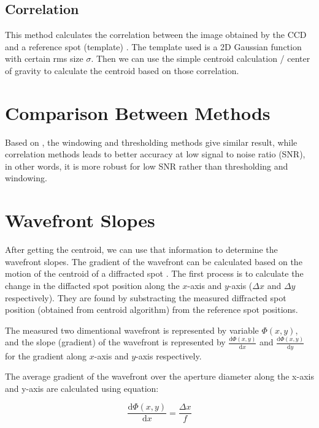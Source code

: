 \documentclass{article}
\begin{document}
\subsection{Correlation}

This method calculates the correlation between the image obtained by the CCD and a reference spot (template) \cite{poyneer03}. The template used is a 2D Gaussian function with certain rms size $\sigma$. Then we can use the simple centroid calculation / center of gravity to calculate the centroid based on those correlation.


\section{Comparison Between Methods}

Based on \cite{thomas04}, the windowing and thresholding methods give similar result, while correlation methods leads to better accuracy at low signal to noise ratio (SNR), in other words, it is more robust for low SNR rather than thresholding and windowing.

\section{Wavefront Slopes}

After getting the centroid, we can use that information to determine the wavefront slopes. The gradient of the wavefront can be calculated based on the motion of the centroid of a diffracted spot \cite{spiricon04}. The first process is to calculate the change in the diffacted spot position along the $x$-axis and $y$-axis ($\Delta x$ and $\Delta y$ respectively). They are found by substracting the measured diffracted spot position (obtained from centroid algorithm) from the reference spot positions.

The measured two dimentional wavefront is represented by variable $\Phi(x,y)$, and the slope (gradient) of the wavefront is represented by $\frac{\mathrm{d} \Phi(x,y)}{\mathrm{d} x}$ and $\frac{\mathrm{d} \Phi(x,y)}{\mathrm{d} y}$ for the gradient along $x$-axis and $y$-axis respectively.

The average gradient of the wavefront over the aperture diameter along the x-axis and y-axis are calculated using equation:

\begin{equation}
\frac{\mathrm{d} \Phi(x,y)}{\mathrm{d} x}=\frac{\Delta x}{f}
\end{equation}
\end{document}
